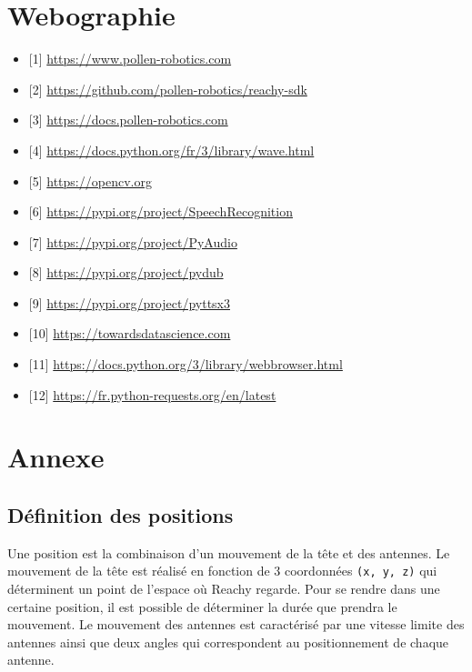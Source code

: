 \section{Webographie}

\begin{itemize}
    \item{[1]} \url{https://www.pollen-robotics.com}
    \item{[2]} \url{https://github.com/pollen-robotics/reachy-sdk}
    \item{[3]} \url{https://docs.pollen-robotics.com}
    \item{[4]} \url{https://docs.python.org/fr/3/library/wave.html}
    \item{[5]} \url{https://opencv.org}
    \item{[6]} \url{https://pypi.org/project/SpeechRecognition}
    \item{[7]} \url{https://pypi.org/project/PyAudio}
    \item{[8]} \url{https://pypi.org/project/pydub}
    \item{[9]} \url{https://pypi.org/project/pyttsx3}
    \item{[10]} \url{https://towardsdatascience.com}
    \item{[11]} \url{https://docs.python.org/3/library/webbrowser.html}
    \item{[12]} \url{https://fr.python-requests.org/en/latest}
    
\end{itemize}
\newpage
\section{Annexe} \label{annexe}

\subsection{Définition des positions} \label{annexemouvement}
Une position est la combinaison d'un mouvement de la tête et des antennes.
Le mouvement de la tête est réalisé en fonction de 3 coordonnées \texttt{(x, y, z)} qui déterminent un point de l'espace où Reachy regarde. Pour se rendre dans une certaine position, il est possible de déterminer la durée que prendra le mouvement. Le mouvement des antennes est caractérisé par une vitesse limite des antennes ainsi que deux angles qui correspondent au positionnement de chaque antenne. \\

